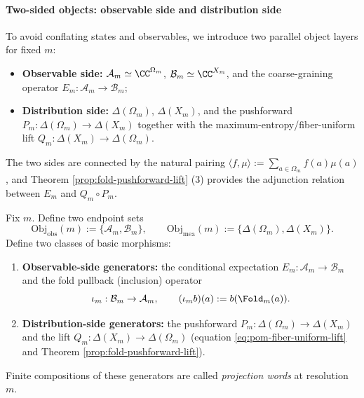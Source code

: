 \paragraph{Two-sided objects: observable side and distribution side}
To avoid conflating states and observables, we introduce two parallel object layers for fixed \(m\):
\begin{itemize}
  \item \textbf{Observable side:} \(\mathcal{A}_m\simeq \CC^{\Omega_m}\), \(\mathcal{B}_m\simeq \CC^{X_m}\), and the coarse-graining operator \(E_m:\mathcal{A}_m\to\mathcal{B}_m\);
  \item \textbf{Distribution side:} \(\Delta(\Omega_m)\), \(\Delta(X_m)\), and the pushforward \(P_m:\Delta(\Omega_m)\to\Delta(X_m)\) together with the maximum-entropy/fiber-uniform lift \(Q_m:\Delta(X_m)\to\Delta(\Omega_m)\).
\end{itemize}
The two sides are connected by the natural pairing
\(
\langle f,\mu\rangle:=\sum_{a\in\Omega_m} f(a)\mu(a)
\),
and Theorem \ref{prop:fold-pushforward-lift} (3) provides the adjunction relation between \(E_m\) and \(Q_m\circ P_m\).

\begin{definition}\label{def:projection-word-category}
Fix \(m\). Define two endpoint sets
\[
\mathrm{Obj}_{\mathrm{obs}}(m):=\{\mathcal{A}_m,\mathcal{B}_m\},\qquad
\mathrm{Obj}_{\mathrm{mea}}(m):=\{\Delta(\Omega_m),\Delta(X_m)\}.
\]
Define two classes of basic morphisms:
\begin{enumerate}
  \item \textbf{Observable-side generators:} the conditional expectation \(E_m:\mathcal{A}_m\to\mathcal{B}_m\) and the fold pullback (inclusion) operator
  \[
  \iota_m:\mathcal{B}_m\to\mathcal{A}_m,\qquad
  (\iota_m b)(a):=b(\Fold_m(a)).
  \]
  \item \textbf{Distribution-side generators:} the pushforward \(P_m:\Delta(\Omega_m)\to\Delta(X_m)\) and the lift \(Q_m:\Delta(X_m)\to\Delta(\Omega_m)\) (equation \eqref{eq:pom-fiber-uniform-lift} and Theorem \ref{prop:fold-pushforward-lift}).
\end{enumerate}
Finite compositions of these generators are called \emph{projection words} at resolution \(m\).
\end{definition}

